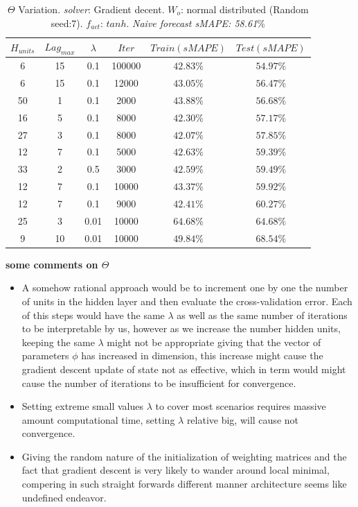 \begin{table}[h!]
	\begin{center}
		\begin{tabular}{||c c c c c c||} 
			\hline
			$H_{units}$ &$Lag_{max}$ &$\lambda$ & $Iter$ & $Train(sMAPE)$ & $Test(sMAPE)$ \\ [0.5ex] 
			\hline\hline
			6& 15 & 0.1 & 100000 & $42.83\%$ & $54.97\%$ \\ 
			\hline
			6& 15 & 0.1 & 12000 & $43.05\%$ & $56.47\%$ \\ 
			\hline
			50& 1 & 0.1 & 2000 & $43.88\%$ & $56.68\%$ \\ 
			\hline
			16& 5 & 0.1 & 8000 & $42.30\%$ & $57.17\%$ \\ 
			\hline
			27& 3 & 0.1 & 8000 & $42.07\%$ & $57.85\%$ \\ 
			\hline
			12& 7 & 0.1 & 5000 & $42.63\%$ & $59.39\%$ \\ 
			\hline
			33& 2 & 0.5 & 3000 & $42.59\%$ & $59.49\%$ \\
			\hline
			12& 7 & 0.1 & 10000 & $43.37\%$ &$59.92\%$ \\ 
			\hline
			12& 7 & 0.1 & 9000 & $42.41\%$ & $60.27\%$ \\ 
			\hline
			25& 3 & 0.01 & 10000 & $64.68\%$ & $64.68\%$ \\ 
			\hline
			9& 10 & 0.01 & 10000 & $49.84\%$ & $68.54\%$ \\ 
			\hline
		\end{tabular}
		\caption{ $\Theta$ Variation. \textit{solver}: Gradient decent. $W_{o}$: normal distributed (Random seed:7). $f_{act}$: $tanh$. \textit{Naive forecast sMAPE: 58.61$\%$}}
		\label{table:mlp_at}
	\end{center}
\end{table}

\textbf{some comments on $\Theta$}
\begin{itemize}
	\item A somehow rational approach would be to increment one by one the number of units in the hidden layer and then evaluate the cross-validation error. Each of this steps would have the same $\lambda$ as well as the same number of iterations to be interpretable by us, however as we increase the number hidden units, keeping the same $\lambda$ might not be appropriate giving that the vector of parameters $\phi$ has increased in dimension, this increase might cause the gradient descent update of state not as effective, which in term would might cause the number of iterations to be insufficient for convergence.
	\item Setting extreme small values $\lambda$ to cover most scenarios requires massive amount computational time, setting $\lambda$ relative big, will cause not convergence.
	\item Giving the random nature of the initialization of weighting matrices and the fact that gradient descent is very likely to wander around local minimal, compering in such straight forwards different manner architecture seems like undefined endeavor.
\end{itemize}




